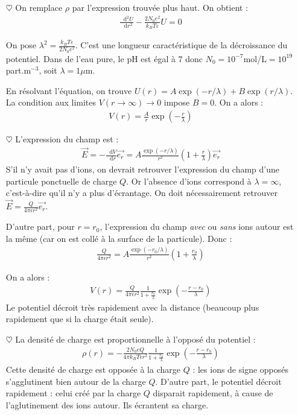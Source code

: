 \documentclass{report}
\newcommand*\dif{\mathop{}\!\mathrm{d}}
\begin{document}
\begin{itemize}
	\item[$\heartsuit$] On remplace $\rho$ par l'expression trouvée plus haut. On obtient : 
	\begin{align*}
		\frac{\dif^2U}{\dif r^2}-\frac{2N_0e^2}{k_BT\varepsilon}U=0
	\end{align*}
	
	On pose $\lambda^2 = \frac{k_BT\varepsilon}{2N_0e^2}$. C'est une longueur caractéristique de la décroissance du potentiel. Dans de l'eau pure, le pH est égal à 7 donc $N_0=10^{-7}$mol/L$=10^{19}$part.m$^{-3}$, soit $\lambda=1\mu$m.
	
	En résolvant l'équation, on trouve $U(r)=A\exp\left(-r/\lambda \right) +B\exp\left(r/\lambda\right)$. La condition aux limites $V(r\longrightarrow\infty)\longrightarrow0$ impose $B=0$. On a alors :
	\begin{align*}
		V(r)=\frac{A}{r}\exp\left(-\frac{r}{\lambda} \right) 
	\end{align*}
	
	\item[$\heartsuit$] L'expression du champ est :
	\begin{align*}
		\vec{E}=-\frac{\dif V}{\dif r}\vec{e_r}=A\frac{\exp(-r/\lambda)}{r^2}\left(1+\frac{r}{\lambda}\right)\vec{e_r}
	\end{align*}
	S'il n'y avait pas d'ions, on devrait retrouver l'expression du champ d'une particule ponctuelle de charge $Q$. Or l'absence d'ions correspond à $\lambda=\infty$, c'est-à-dire qu'il n'y a plus d'écrantage. On doit nécessairement retrouver $\vec{E}=\frac{Q}{4\pi\epsilon r^2}\vec{e_r}$.
	
	D'autre part, pour $r=r_0$, l'expression du champ \textit{avec} ou \textit{sans} ions autour est la même (car on est collé à la surface de la particule). Donc :
	\begin{align*}
		\frac{Q}{4\pi\epsilon r^2}=A\frac{\exp(-r_0/\lambda)}{r^2}\left(1+\frac{r_0}{\lambda}\right)
	\end{align*}
	
	On a alors :
	\begin{align*}
		V(r)=\frac{Q}{4\pi\epsilon r^2}\frac{1}{1+\frac{r_0}{\lambda}}\exp\left(-\frac{r-r_0}{\lambda} \right) 
	\end{align*}
	Le potentiel décroit très rapidement avec la distance (beaucoup plus rapidement que si la charge était seule).
	
	\item[$\heartsuit$] La densité de charge est proportionnelle à l'opposé du potentiel :
	\begin{align*}
		\rho(r)=-\frac{2N_0eQ}{4\pi k_BT\epsilon r^2}\frac{1}{1+\frac{r_0}{\lambda}}\exp\left(-\frac{r-r_0}{\lambda} \right) 
	\end{align*}	
	Cette densité de charge est opposée à la charge $Q$ : les ions de signe opposés s'agglutinent bien autour de la charge $Q$. D'autre part, le potentiel décroit rapidement : celui créé par la charge $Q$ disparait rapidement, à cause de l'aglutinement des ions autour. Ils écrantent sa charge.
	

\end{itemize}
\end{document}

